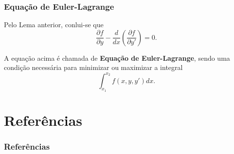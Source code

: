 \documentclass{beamer}
\begin{document}
	\begin{frame}
		\frametitle{Equação de Euler-Lagrange}
		\justify
	
		Pelo Lema anterior, conlui-se que
		$$
			\frac{\partial f}{\partial y} - \frac{d}{dx} \left ( \frac{\partial f}{\partial y'} \right )=0 \text{.}
		$$
		\pause
	
		A equação acima é chamada de \textbf{Equação de Euler-Lagrange}, sendo uma condição necessária para minimizar ou maximizar a integral
		$$
			\int_{x_1}^{x_2} f(x, y, y')dx \text{.}
		$$
	\end{frame}

	\section{Referências}
	\begin{frame}
		\frametitle{Referências}
		
	\end{frame}
\end{document}
